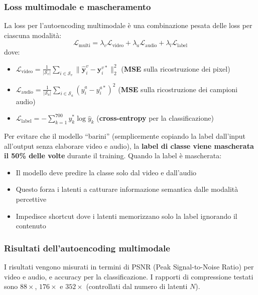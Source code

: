 \documentclass[12pt,a4paper]{article}
\begin{document}
\subsubsection{Loss multimodale e mascheramento}

La loss per l'autoencoding multimodale \`e una combinazione pesata delle loss per ciascuna modalit\`a:
\[
\mathcal{L}_{\text{multi}} = \lambda_v \mathcal{L}_{\text{video}} + \lambda_a \mathcal{L}_{\text{audio}} + \lambda_l \mathcal{L}_{\text{label}}
\]
dove:
\begin{itemize}
    \item $\mathcal{L}_{\text{video}} = \frac{1}{|\mathcal{S}_v|}\sum_{i \in \mathcal{S}_v} \|\hat{\mathbf{y}}_i^v - \mathbf{y}_i^{v*}\|_2^2$ (\textbf{MSE} sulla ricostruzione dei pixel)
    \item $\mathcal{L}_{\text{audio}} = \frac{1}{|\mathcal{S}_a|}\sum_{i \in \mathcal{S}_a} (\hat{y}_i^a - y_i^{a*})^2$ (\textbf{MSE} sulla ricostruzione dei campioni audio)
    \item $\mathcal{L}_{\text{label}} = -\sum_{k=1}^{700} y_k^* \log \hat{y}_k$ (\textbf{cross-entropy} per la classificazione)
\end{itemize}

\begin{notabox}
Per evitare che il modello ``barini'' (semplicemente copiando la label dall'input all'output senza elaborare video e audio), la \textbf{label di classe viene mascherata il 50\% delle volte} durante il training. Quando la label \`e mascherata:
\begin{itemize}
    \item Il modello deve predire la classe solo dal video e dall'audio
    \item Questo forza i latenti a catturare informazione semantica dalle modalit\`a percettive
    \item Impedisce shortcut dove i latenti memorizzano solo la label ignorando il contenuto
\end{itemize}
\end{notabox}

\subsubsection{Risultati dell'autoencoding multimodale}

I risultati vengono misurati in termini di PSNR (Peak Signal-to-Noise Ratio) per video e audio, e accuracy per la classificazione. I rapporti di compressione testati sono $88\times$, $176\times$ e $352\times$ (controllati dal numero di latenti $N$).
\end{document}
